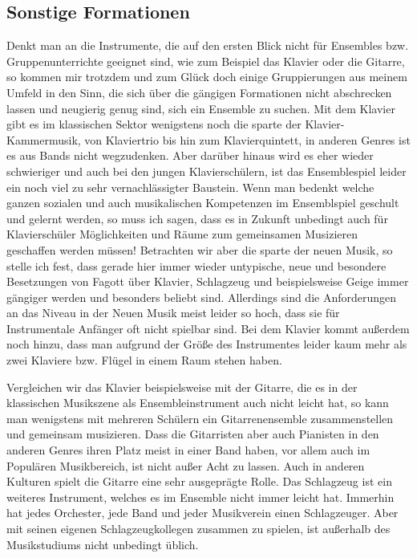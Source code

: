 \subsection{Sonstige Formationen}
Denkt man an die Instrumente, die auf den ersten Blick nicht für Ensembles bzw.
Gruppenunterrichte geeignet sind, wie zum Beispiel das Klavier oder die Gitarre,
so kommen mir trotzdem und zum Glück doch einige Gruppierungen aus meinem Umfeld
in den Sinn, die sich über die gängigen Formationen nicht abschrecken lassen und
neugierig genug sind, sich ein Ensemble zu suchen. Mit dem Klavier gibt es im
klassischen Sektor wenigstens noch die sparte der Klavier-Kammermusik, von
Klaviertrio bis hin zum Klavierquintett, in anderen Genres ist es aus Bands
nicht wegzudenken. Aber darüber hinaus wird es eher wieder schwieriger und auch
bei den jungen Klavierschülern, ist das Ensemblespiel leider ein noch viel zu
sehr vernachlässigter Baustein. Wenn man bedenkt welche ganzen sozialen und auch
musikalischen Kompetenzen im Ensemblspiel geschult und gelernt werden, so muss
ich sagen, dass es in Zukunft unbedingt auch für Klavierschüler Möglichkeiten
und Räume zum gemeinsamen Musizieren geschaffen werden müssen! Betrachten wir
aber die sparte der neuen Musik, so stelle ich fest, dass gerade hier immer
wieder untypische, neue und besondere Besetzungen von Fagott über Klavier,
Schlagzeug und beispielsweise Geige immer gängiger werden und besonders beliebt
sind. Allerdings sind die Anforderungen an das Niveau in der Neuen Musik meist
leider so hoch, dass sie für Instrumentale Anfänger oft nicht spielbar sind. Bei
dem Klavier kommt außerdem noch hinzu, dass man aufgrund der Größe des
Instrumentes leider kaum mehr als zwei Klaviere bzw. Flügel in einem Raum stehen
haben. 

Vergleichen wir das Klavier beispielsweise mit der Gitarre, die es in der
klassischen Musikszene als Ensembleinstrument auch nicht leicht hat, so kann man
wenigstens mit mehreren Schülern ein Gitarrenensemble zusammenstellen und
gemeinsam musizieren. Dass die Gitarristen aber auch Pianisten in den anderen
Genres ihren Platz meist in einer Band haben, vor allem auch im Populären
Musikbereich, ist nicht außer Acht zu lassen. Auch in anderen Kulturen spielt
die Gitarre eine sehr ausgeprägte Rolle. Das Schlagzeug ist ein weiteres
Instrument, welches es im Ensemble nicht immer leicht hat. Immerhin hat jedes
Orchester, jede Band und jeder Musikverein einen Schlagzeuger. Aber mit seinen
eigenen Schlagzeugkollegen zusammen zu spielen, ist außerhalb des Musikstudiums
nicht unbedingt üblich. 






